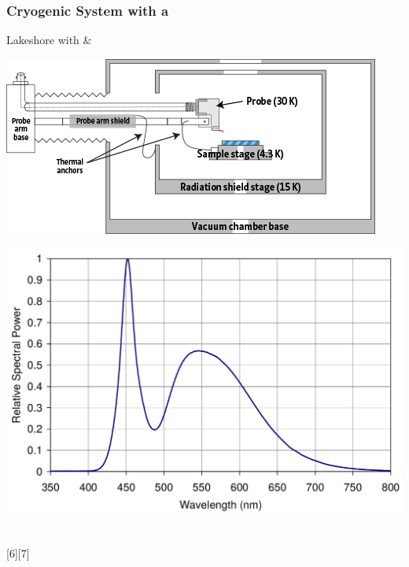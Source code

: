 \documentclass{beamer}
\begin{document}
\begin{frame}
\frametitle{Cryogenic System with a \kp{}}
\begin{block}{Lakeshore with \McA{} \& \led{}}
\centering
\begin{minipage}{0.45\linewidth}
\centering
	\includegraphics[width=1\linewidth]{./figs/pres/Config_TTPX}
\end{minipage}
\hfill
\begin{minipage}{0.45\linewidth}
\centering
	\includegraphics[width=1\linewidth]{./figs/pres/ledspec}
\end{minipage}\\
\hspace{0.25\linewidth}\textcolor{RUred}{[6]}\hfill\textcolor{RUred}{[7]}\hspace{0.2\linewidth}
\end{block}\end{frame}
\end{document}

